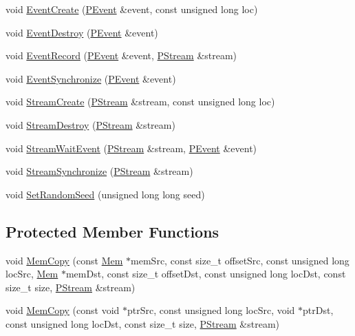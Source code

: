 \begin{DoxyCompactItemize}
\item 
void \hyperlink{classfractal_1_1Engine_a49adf2ea56f47259c18841f66c0d2ec4}{Event\+Create} (\hyperlink{classfractal_1_1PEvent}{P\+Event} \&event, const unsigned long loc)
\item 
void \hyperlink{classfractal_1_1Engine_a28d6e3dfae065d1d66ee620db41b2e89}{Event\+Destroy} (\hyperlink{classfractal_1_1PEvent}{P\+Event} \&event)
\item 
void \hyperlink{classfractal_1_1Engine_a16d23d2844a3bb63df695b2455361a67}{Event\+Record} (\hyperlink{classfractal_1_1PEvent}{P\+Event} \&event, \hyperlink{classfractal_1_1PStream}{P\+Stream} \&stream)
\item 
void \hyperlink{classfractal_1_1Engine_a4fcd94e93136aa3a4b417da250081a6a}{Event\+Synchronize} (\hyperlink{classfractal_1_1PEvent}{P\+Event} \&event)
\item 
void \hyperlink{classfractal_1_1Engine_a780e465320bee254134a304ac30d5085}{Stream\+Create} (\hyperlink{classfractal_1_1PStream}{P\+Stream} \&stream, const unsigned long loc)
\item 
void \hyperlink{classfractal_1_1Engine_a5e0a97f06aa994afa0db976d93ed67e7}{Stream\+Destroy} (\hyperlink{classfractal_1_1PStream}{P\+Stream} \&stream)
\item 
void \hyperlink{classfractal_1_1Engine_adacb8057e763bf56883945cce3994814}{Stream\+Wait\+Event} (\hyperlink{classfractal_1_1PStream}{P\+Stream} \&stream, \hyperlink{classfractal_1_1PEvent}{P\+Event} \&event)
\item 
void \hyperlink{classfractal_1_1Engine_ad2269e3394f4270d5611234702029bc9}{Stream\+Synchronize} (\hyperlink{classfractal_1_1PStream}{P\+Stream} \&stream)
\item 
void \hyperlink{classfractal_1_1Engine_a2e4e430fb8ce9306d07afe33aa668f51}{Set\+Random\+Seed} (unsigned long long seed)
\end{DoxyCompactItemize}
\subsection*{Protected Member Functions}
\begin{DoxyCompactItemize}
\item 
void \hyperlink{classfractal_1_1Engine_af63cba9be1c0af513e8155678edf8bf4}{Mem\+Copy} (const \hyperlink{classfractal_1_1Mem}{Mem} $\ast$mem\+Src, const size\+\_\+t offset\+Src, const unsigned long loc\+Src, \hyperlink{classfractal_1_1Mem}{Mem} $\ast$mem\+Dst, const size\+\_\+t offset\+Dst, const unsigned long loc\+Dst, const size\+\_\+t size, \hyperlink{classfractal_1_1PStream}{P\+Stream} \&stream)
\item 
void \hyperlink{classfractal_1_1Engine_af28d68ffb1ec940480fddabef7b2cbe8}{Mem\+Copy} (const void $\ast$ptr\+Src, const unsigned long loc\+Src, void $\ast$ptr\+Dst, const unsigned long loc\+Dst, const size\+\_\+t size, \hyperlink{classfractal_1_1PStream}{P\+Stream} \&stream)
\end{DoxyCompactItemize}
